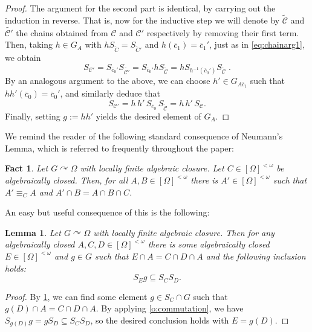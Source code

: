 \documentclass{article}
\newtheorem{lemma}[theorem]{Lemma}
\newtheorem{fact}[theorem]{Fact}
\theoremstyle{remark}
\theoremstyle{definition}
\def\acts{\curvearrowright}
\newcommand{\nn}[0]{S}%
\newcommand{\C}[0]{\mathcal{C}}
\newcommand{\fps}[1]{[#1]^{<\omega}}
\begin{document}
{{{{{\begin{proof}
  {The argument for the second part is identical, by carrying out the induction in reverse. That is, now for the inductive step we will denote by $\tilde{\C}$ and $\tilde{\C'}$ the chains obtained from $\C$ and $\C'$ respectively by removing their first term. Then, taking $h\in G_A$ with $h \nn_{\tilde{C}}=\nn_{\tilde{C}'}$ and $h(\overline{c}_1)=\overline{c}_1'$, just as in \eqref{eq:chainarg1}, we obtain} 
  \begin{equation}
    \label{nn equality}	\nn_{\C'}=\nn_{\overline{c}_0'}\nn_{\widetilde{\C'}}=\nn_{\overline{c}_0'}h\nn_{\widetilde{\C}}=h\nn_{h^{-1}(\overline{c}_0')}\nn_{\widetilde{\C}}\;.  
    \end{equation}
{By an analogous argument to the above, we can choose $h'\in G_{A\overline{c}_1}$ such that $h h' (\overline{c}_0)=\overline{c}_0'$, and similarly deduce that} 
\begin{equation*}
    \nn_{\C'}
      = h\,h'\,\nn_{\overline{c}_0}\,\nn_{\widetilde{\C}}
      = h\,h'\,\nn_{\C}.
  \end{equation*}
   {Finally, setting $g := hh'$ yields the desired element of $G_A$.}
  
  \end{proof}
 

  
  
  We remind the reader of the following standard consequence of Neumann's Lemma, which is referred to frequently throughout the paper:  
  \begin{fact}
  	\label{f:neumann} {Let $G\acts\Omega$ with locally finite algebraic closure.} Let $C\in\fps{\Omega}$ be algebraically closed. Then, for all $A, B\in\fps{\Omega}$ there is $A'\in \fps{\Omega} $ such that $A'\equiv_C A$ and $A'\cap B= A\cap B\cap C$.  
  \end{fact}
  
  An easy but useful consequence of this is the following: 
  \begin{lemma}
 	\label{l:intersections} Let $G\acts\Omega$ with locally finite algebraic closure.
 	Then for any algebraically closed $A,C,D\in\fps{\Omega}$  there is some algebraically closed $E\in\fps{\Omega}$ and $g\in G$ such that $E\cap A=C\cap D\cap A$ and the following inclusion holds:
  \begin{equation*}
  	\nn_{E}g\subseteq \nn_{C}\nn_{D}.
  \end{equation*}
 \end{lemma}
 \begin{proof}
 	By \cref{f:neumann}, we can find some element $g\in \nn_{C}\cap G$ such that $g(D)\cap A=C\cap D\cap A$. By applying \cref{o:commutation}, we have $\nn_{g(D)}g=g\nn_{D}\subseteq\nn_{C}\nn_{D}$, so the desired conclusion holds with $E=g(D)$. 
 \end{proof}
 
}}}}}
\end{document}
